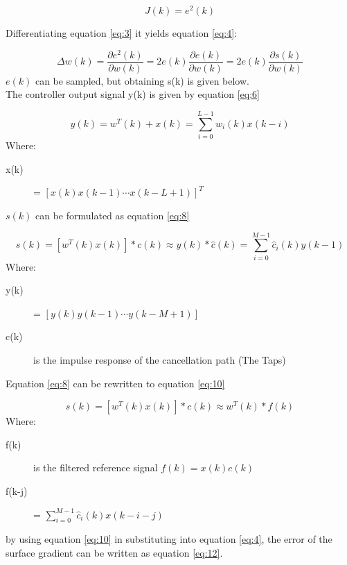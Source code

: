 \begin{equation}\label{eq:3}
J(k) = e^2(k)
\end{equation}

Differentiating equation \ref{eq:3} it yields equation \ref{eq:4}:

\begin{equation}\label{eq:4}
\Delta w(k) = \frac{\partial e^2(k)}{\partial w(k)} = 2e(k)\frac{\partial e(k)}{\partial w(k)} = 2e(k)\frac{\partial s(k)}{\partial w(k)}
\end{equation}
$e(k)$ can be sampled, but obtaining s(k) is given below. \\
The controller output signal y(k) is given by equation \ref{eq:6} 

\begin{equation}\label{eq:6}
y(k) = w^T(k) + x(k) = \sum_{i=0}^{L-1} w_i(k)x(k-i)
\end{equation}
Where:
\begin{description}
	\item[x(k)] = $[x(k) x(k-1) \cdots x(k-L+1)]^T $
\end{description}
$s(k)$ can be formulated as equation \ref{eq:8}

\begin{equation}\label{eq:8}
s(k) = [w^T(k)x(k)]*c(k)\approx y(k)*\hat{c}(k) = \sum_{i=0}^{M-1}\hat{c}_i(k)y(k-1)
\end{equation}
Where:
\begin{description}
	\item[y(k)] = $[ y(k) y(k-1) \cdots y(k-M+1)]$
	\item[c(k)] is the impulse response of the cancellation path (The Taps)
\end{description}

Equation \ref{eq:8} can be rewritten to equation \ref{eq:10}

\begin{equation}\label{eq:10}
s(k) = [w^T(k)x(k)]*c(k)\approx w^T(k)*f(k)
\end{equation}
Where:
\begin{description}
	\item[f(k)] is the filtered reference signal $f(k)=x(k)c(k)$
	\item[f(k-j)] = $\sum_{i=0}^{M-1}\hat{c}_i(k)x(k-i-j)$
\end{description}

by using equation \ref{eq:10} in substituting into equation \ref{eq:4}, the error of the surface gradient can be written as equation \ref{eq:12}.

